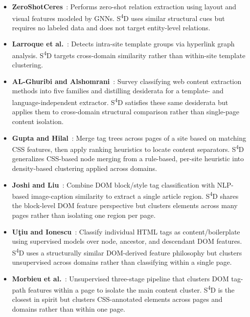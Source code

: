 \begin{itemize}
    \item \textbf{ZeroShotCeres}~\cite{lockard2020zeroshotceres}: Performs zero-shot relation extraction using layout and visual features modeled by GNNs. S\textsuperscript{4}D uses similar structural cues but requires no labeled data and does not target entity-level relations.

    \item \textbf{Larroque et al.}~\cite{larroque2014template}: Detects intra-site template groups via hyperlink graph analysis. S\textsuperscript{4}D targets cross-domain similarity rather than within-site template clustering.

    \item \textbf{AL-Ghuribi and Alshomrani}~\cite{alghuribi2013survey}: Survey classifying web content extraction methods into five families and distilling desiderata for a template- and language-independent extractor. S\textsuperscript{4}D satisfies these same desiderata but applies them to cross-domain structural comparison rather than single-page content isolation.

    \item \textbf{Gupta and Hilal}~\cite{gupta2011heuristic}: Merge tag trees across pages of a site based on matching CSS features, then apply ranking heuristics to locate content separators. S\textsuperscript{4}D generalizes CSS-based node merging from a rule-based, per-site heuristic into density-based clustering applied across domains.

    \item \textbf{Joshi and Liu}~\cite{joshi2009domnlp}: Combine DOM block/style tag classification with NLP-based image-caption similarity to extract a single article region. S\textsuperscript{4}D shares the block-level DOM feature perspective but clusters elements across many pages rather than isolating one region per page.

    \item \textbf{U\c{t}iu and Ionescu}~\cite{utiu2018domfeatures}: Classify individual HTML tags as content/boilerplate using supervised models over node, ancestor, and descendant DOM features. S\textsuperscript{4}D uses a structurally similar DOM-derived feature philosophy but clusters unsupervised across domains rather than classifying within a single page.

    \item \textbf{Morbieu et al.}~\cite{morbieu2020kernix}: Unsupervised three-stage pipeline that clusters DOM tag-path features within a page to isolate the main content cluster. S\textsuperscript{4}D is the closest in spirit but clusters CSS-annotated elements across pages and domains rather than within one page.


\end{itemize}
